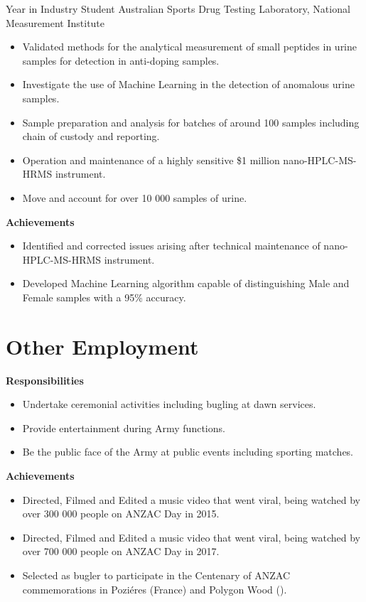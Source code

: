 {Year in Industry Student}
{Australian Sports Drug Testing Laboratory, National Measurement Institute}
{}{}
{%
  \begin{itemize}
    \item Validated methods for the analytical measurement of small peptides in urine samples
      for detection in anti-doping samples.
    \item Investigate the use of Machine Learning in the detection of anomalous urine samples.
    \item Sample preparation and analysis for batches of around 100 samples including chain of custody and reporting.
    \item Operation and maintenance of a highly sensitive \$1 million nano-HPLC-MS-HRMS instrument.
    \item Move and account for over 10 000 samples of urine.
  \end{itemize}
  \textbf{Achievements}
  \begin{itemize}
    \item Identified and corrected issues arising after technical maintenance of nano-HPLC-MS-HRMS instrument.
    \item Developed Machine Learning algorithm capable of distinguishing Male and Female samples with a 95\% accuracy.
  \end{itemize}
}

\pagebreak
\section{Other Employment}

{}{}
{%
\textbf{Responsibilities}
\begin{itemize}
  \item Undertake ceremonial activities including bugling at dawn services.
  \item Provide entertainment during Army functions.
  \item Be the public face of the Army at public events including sporting matches.
\end{itemize}
\textbf{Achievements}
\begin{itemize}
  \item Directed, Filmed and Edited a music video  that went viral, being watched by over 300 000 people on ANZAC Day in 2015.
  \item Directed, Filmed and Edited a music video  that went viral, being watched by over 700 000 people on ANZAC Day in 2017.
  \item Selected as bugler to participate in the Centenary of ANZAC commemorations in Poziéres (France) and Polygon Wood ().
\end{itemize}
}

